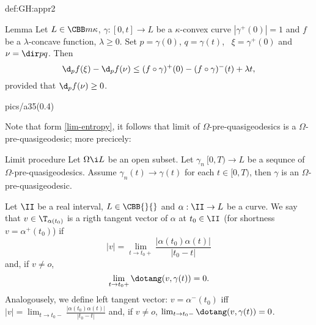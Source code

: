 {\begin{subthm}{def:GH:appr2}
\begin{thm}{Lemma} \label{lem:angle-d} Let $L\in\CBB m \kappa$, $\gamma:[0,t]\to L$ be a $\kappa$-convex curve $|\gamma^+(0)|=1$ and $f$ be a $\lambda$-concave function, $\lambda\ge0$.
Set $p=\gamma(0)$, $q=\gamma(t)$, \
$\xi=\gamma^+(0)$ and $\nu=\dir p q$. 
Then
$$\d_p f(\xi)-\d_p f(\nu)\le
(f\circ\gamma)^+(0)-(f\circ\gamma)^-(t)+\lambda t,$$ 
provided that $\d_p f(\nu)\ge 0$.
\end{thm}

\begin{lpic}{pics/a35(0.4)}
\end{lpic}














Note that form \ref{lim-entropy}, it follows that limit of $\Omega$-pre-quasigeodesics is a $\Omega$-pre-quasigeodesic;
more precicely:

\begin{thm}{Limit procedure}
Let $\Omega\i L$ be an open subset.
Let $\gamma_n\:[0,T)\to L$ be a sequnce of $\Omega$-pre-quasigeodesics.
Assume $\gamma_n(t)\to\gamma(t)$ for each $t\in [0,T)$, 
then $\gamma$ is an $\Omega$-pre-quasigeodesic.
\end{thm}













Let $\II$ be a real interval,
$L\in\CBB{}{}$ 
and $\alpha:\II\to L$ be a curve.
We say that $v\in\T_{\alpha(t_0)}$ is a rigth tangent vector of $\alpha$ at $t_0\in\II$ (for shortness $v=\alpha^+(t_0)$)
if 
$$|v|=\lim_{t\to t_0+}\frac{|\alpha(t_0)\alpha(t)|}{|t_0-t|}$$
and, if $v\not=o$,
$$\lim_{t\to t_0+}\dotang(v,\gamma(t))=0.$$
Analogousely, we define left tangent vector:
$v=\alpha^-(t_0)$
iff
$|v|=\lim_{t\to t_0-}\frac{|\alpha(t_0)\alpha(t)|}{|t_0-t|}$
and, if $v\not=o$,
$\lim_{t\to t_0-}\dotang(v,\gamma(t))=0$.












\end{subthm}}

